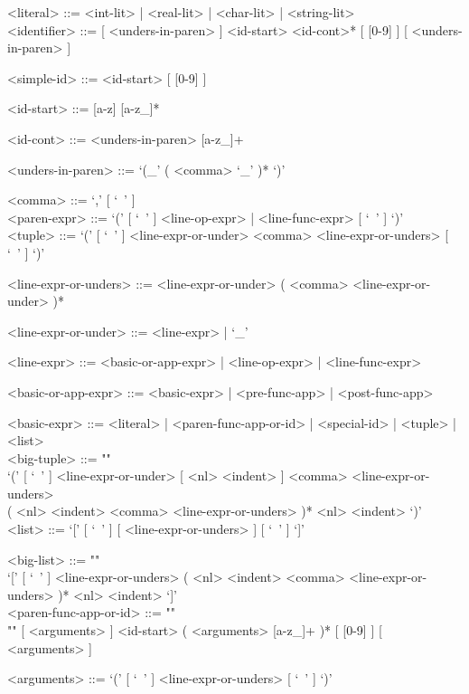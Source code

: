\documentclass[diploma]{softlab-thesis}
\begin{document}
\begin{grammar}

<literal> ::= <int-lit> | <real-lit> | <char-lit> | <string-lit>
\\

<identifier> ::=
[ <unders-in-paren> ] <id-start> <id-cont>* [ [0-9] ] [ <unders-in-paren> ]

<simple-id> ::= <id-start> [ [0-9] ]

<id-start> ::= [a-z] [a-z_]*

<id-cont> ::= <unders-in-paren> [a-z_]+

<unders-in-paren> ::= `(_' ( <comma> `_' )* `)'

<comma> ::= `,' [ `\ ' ]
\\

<paren-expr> ::= `(' [ `\ ' ] <line-op-expr> | <line-func-expr> [ `\ ' ] `)'
\\

<tuple> ::=
`(' [ `\ ' ] <line-expr-or-under> <comma> <line-expr-or-unders> [ `\ ' ] `)'

<line-expr-or-unders> ::=
<line-expr-or-under> ( <comma> <line-expr-or-under> )*

<line-expr-or-under> ::= <line-expr> | `_'

<line-expr> ::= <basic-or-app-expr> | <line-op-expr> | <line-func-expr>

<basic-or-app-expr> ::= <basic-expr> | <pre-func-app> | <post-func-app>

<basic-expr> ::=
<literal> | <paren-func-app-or-id> | <special-id> | <tuple> | <list>
\\

<big-tuple> ::= ""\\
`(' [ `\ ' ] <line-expr-or-under> [ <nl> <indent> ]
<comma> <line-expr-or-unders> \\
( <nl> <indent> <comma> <line-expr-or-unders> )*
<nl> <indent> `)'
\\

\newpage
<list> ::= `[' [ `\ ' ] [ <line-expr-or-unders> ] [ `\ ' ] `]'

<big-list> ::= ""\\
`[' [ `\ ' ] <line-expr-or-unders>
( <nl> <indent> <comma> <line-expr-or-unders> )* <nl> <indent> `]'
\\

<paren-func-app-or-id> ::= ""\\""
[ <arguments> ] <id-start> ( <arguments> [a-z_]+ )* [ [0-9] ]
[ <arguments> ]

<arguments> ::= `(' [ `\ ' ] <line-expr-or-unders> [ `\ ' ] `)'
\\


\end{grammar}
\end{document}
